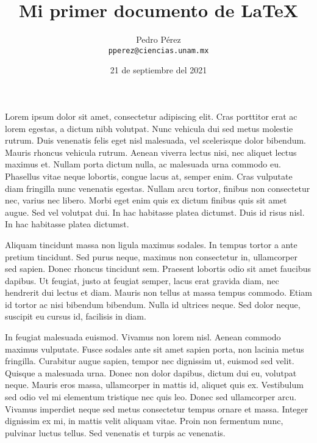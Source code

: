 \documentclass{article}
\title{Mi primer documento de \LaTeX}
\author{Pedro Pérez\\
        \texttt{pperez@ciencias.unam.mx}}
\date{21 de septiembre del 2021}
\begin{document}
  \maketitle

  Lorem ipsum dolor sit amet, consectetur adipiscing elit. Cras porttitor erat ac 
  lorem egestas, a dictum nibh volutpat. Nunc vehicula dui sed metus molestie 
  rutrum. Duis venenatis felis eget nisl malesuada, vel scelerisque dolor 
  bibendum. Mauris rhoncus vehicula rutrum. Aenean viverra lectus nisi, nec 
  aliquet lectus maximus et. Nullam porta dictum nulla, ac malesuada urna commodo 
  eu. Phasellus vitae neque lobortis, congue lacus at, semper enim. Cras 
  vulputate diam fringilla nunc venenatis egestas. Nullam arcu tortor, finibus 
  non consectetur nec, varius nec libero. Morbi eget enim quis ex dictum finibus 
  quis sit amet augue. Sed vel volutpat dui. In hac habitasse platea dictumst. 
  Duis id risus nisl. In hac habitasse platea dictumst.
  
  Aliquam tincidunt massa non ligula maximus sodales. In tempus tortor a ante 
  pretium tincidunt. Sed purus neque, maximus non consectetur in, ullamcorper 
  sed sapien. Donec rhoncus tincidunt sem. Praesent lobortis odio sit amet 
  faucibus dapibus. Ut feugiat, justo at feugiat semper, lacus erat gravida diam,
  nec hendrerit dui lectus et diam. Mauris non tellus at massa tempus commodo. 
  Etiam id tortor ac nisi bibendum bibendum. Nulla id ultrices neque. Sed dolor 
  neque, suscipit eu cursus id, facilisis in diam.
  
  In feugiat malesuada euismod. Vivamus non lorem nisl. Aenean commodo maximus 
  vulputate. Fusce sodales ante sit amet sapien porta, non lacinia metus 
  fringilla. Curabitur augue sapien, tempor nec dignissim ut, euismod sed velit. 
  Quisque a malesuada urna. Donec non dolor dapibus, dictum dui eu, volutpat 
  neque. Mauris eros massa, ullamcorper in mattis id, aliquet quis ex. Vestibulum 
  sed odio vel mi elementum tristique nec quis leo. Donec sed ullamcorper arcu. 
  Vivamus imperdiet neque sed metus consectetur tempus ornare et massa. Integer 
  dignissim ex mi, in mattis velit aliquam vitae. Proin non fermentum nunc, 
  pulvinar luctus tellus. Sed venenatis et turpis ac venenatis.
\end{document}
